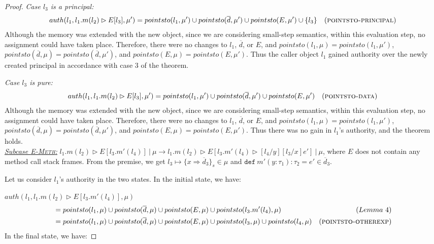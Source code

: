 \documentclass{llncs}
\newcommand{\keywadj}[1]{\mathtt{#1}}
\newcommand{\keyw}[1]{\keywadj{#1}~}
\begin{document}
\begin{proof}
\noindent\textit{Case $l_3$ is a principal:}
\begin{align*}
auth(l_1, l_1.m(l_2) \rhd E[l_3], \mu') &= pointsto(l_1, \mu') \cup pointsto(\overline{d}, \mu') \cup pointsto(E, \mu') \cup \{ l_3 \} & (\textsc{pointsto-principal})
\end{align*}
Although the memory was extended with the new object, since we are considering small-step semantics, within this evaluation step, no assignment could have taken place. Therefore, there were no changes to $l_1$, $\overline{d}$, or $E$, and $pointsto(l_1, \mu) = pointsto(l_1, \mu')$, $pointsto(\overline{d}, \mu) = pointsto(\overline{d}, \mu')$, and $pointsto(E, \mu) = pointsto(E, \mu')$. Thus the caller object $l_1$ gained authority over the newly created principal in accordance with case 3 of the theorem.

\noindent\textit{Case $l_3$ is pure:}
\begin{align*}
auth(l_1, l_1.m(l_2) \rhd E[l_3], \mu') &= pointsto(l_1, \mu') \cup pointsto(\overline{d}, \mu') \cup pointsto(E, \mu') & (\textsc{pointsto-data})
\end{align*}
Although the memory was extended with the new object, since we are considering small-step semantics, within this evaluation step, no assignment could have taken place. Therefore, there were no changes to $l_1$, $\overline{d}$, or $E$, and $pointsto(l_1, \mu) = pointsto(l_1, \mu')$, $pointsto(\overline{d}, \mu) = pointsto(\overline{d}, \mu')$, and $pointsto(E, \mu) = pointsto(E, \mu')$. Thus there was no gain in $l_1$'s authority, and the theorem holds.\\

\noindent\underline{\textit{Subcase \textsc{E-Meth}:}}
$l_1.m(l_2) \rhd E[l_3.m'(l_4)]~|~\mu \longrightarrow l_1.m(l_2) \rhd E[l_3.m'(l_4) \rhd [l_4/y] [l_3/x] e']~|~\mu$, where $E$ does not contain any method call stack frames. From the premise, we get $l_3 \mapsto \{ x \Rightarrow \overline{d}_3 \}_{s} \in \mu$ and $\keyw{def} m'(y : \tau_1) : \tau_2 = e' \in \overline{d}_3$.

\noindent Let us consider $l_1$'s authority in the two states. In the initial state, we have:

\noindent$auth(l_1, l_1.m(l_2) \rhd E[l_3.m'(l_4)], \mu)$
\vspace{-7pt}
\begin{align*}
&= pointsto(l_1, \mu) \cup pointsto(\overline{d}, \mu) \cup pointsto(E, \mu) \cup pointsto(l_3.m'(l_4), \mu) & (Lemma~4)\\
&= pointsto(l_1, \mu) \cup pointsto(\overline{d}, \mu) \cup pointsto(E, \mu) \cup pointsto(l_3, \mu) \cup pointsto(l_4, \mu) & (\textsc{pointsto-otherexp})
\end{align*}
In the final state, we have:


\end{proof}
\end{document}
